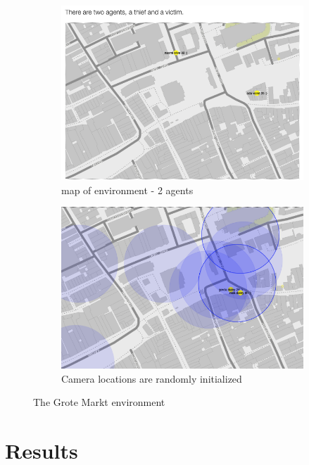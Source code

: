 \begin{figure}[htbp]
\begin{center}
\begin{subfigure}{.5\textwidth}
\includegraphics[width=\linewidth]{images/grotemarktmap.png}
\caption{map of environment - 2 agents}
\end{subfigure}%
\begin{subfigure}{.5\textwidth}
\includegraphics[width=\linewidth]{images/grotemarktCameras.png}
\caption{Camera locations are randomly initialized}
\end{subfigure}%
\label{groteMarkt}
\caption{The Grote Markt environment}
\end{center}
\end{figure}



\section{Results}

